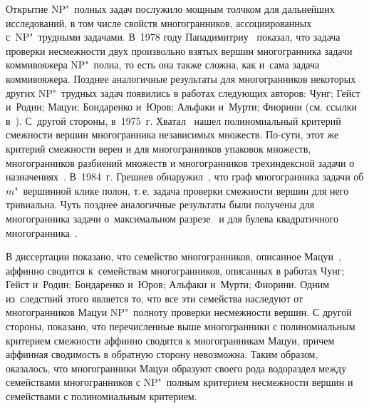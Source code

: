 Открытие NP"~полных задач послужило мощным толчком для дальнейших исследований,
в том числе свойств многогранников, ассоциированных с~NP"~трудными задачами.
В~1978 году Пападимитриу~\cite{Papadimitriou:1978} показал, 
что задача проверки несмежности двух произвольно взятых вершин многогранника задачи коммивояжера NP"~полна,
то есть она также сложна, как и~сама задача коммивояжера.
Позднее аналогичные результаты для многогранников некоторых других NP"~трудных задач появились в работах следующих авторов: Чунг; Гейст и~Родин; Мацуи; Бондаренко и~Юров; Альфаки и~Мурти; Фиорини (см. ссылки в~).
С~другой стороны, в~1975~г. Хватал~\cite{Chvatal:1975} нашел полиномиальный критерий смежности вершин многогранника независимых множеств.
По-сути, этот же критерий смежности верен и для многогранников упаковок множеств, многогранников разбиений множеств и многогранников трехиндексной задачи о назначениях~\cite{Ikura:1985}.
В~1984~г. Грешнев обнаружил~\cite{Greshnev:1984}, что граф многогранника задачи об $m$"~вершинной клике полон, т.\,е. задача проверки смежности вершин для него тривиальна.
Чуть позднее аналогичные результаты были получены для многогранника задачи о~максимальном разрезе~\cite{Beloshevskii:1986,Barahona:1986} и для 
булева квадратичного многогранника~\cite{Bondarenko:1987, Padberg:1989}.

В диссертации показано, что семейство многогранников, описанное Мацуи~\cite{Matsui:1995}, аффинно сводится к~семействам многогранников, описанных в работах Чунг; Гейст и~Родин; Бондаренко и~Юров; Альфаки и~Мурти; Фиорини. Одним из~следствий этого является то, что все эти семейства наследуют от многогранников Мацуи NP"~полноту проверки несмежности вершин.
С другой стороны, показано, что перечисленные выше многогранники с полиномиальным критерием смежности аффинно сводятся к многогранникам Мацуи, причем аффинная сводимость в обратную сторону невозможна. Таким образом, оказалось, что многогранники Мацуи образуют своего рода водораздел между семействами многогранников с NP"~полным критерием несмежности вершин и семействами с полиномиальным критерием.



